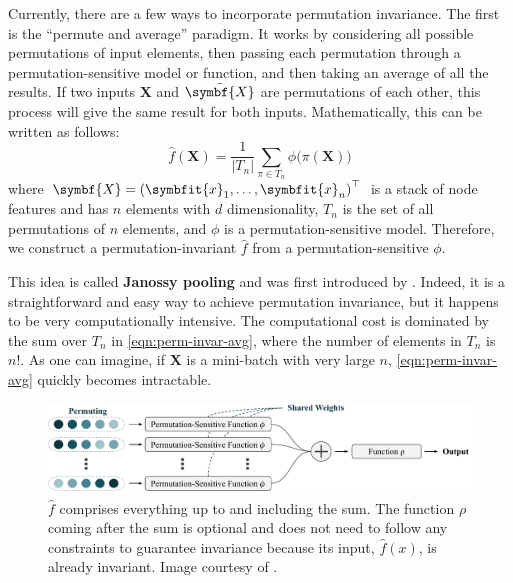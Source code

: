 Currently, there are a few ways to incorporate permutation invariance. The first is the ``permute and average'' paradigm. It works by considering all possible permutations of input elements, then passing each permutation through a permutation-sensitive model or function, and then taking an average of all the results. If two inputs $\symbf{X}$ and $\Tilde{\symbf{X}}$ are permutations of each other, this process will give the same result for both inputs. Mathematically, this can be written as follows:
\begin{equation}
    \label{eqn:perm-invar-avg}
    \widehat{f}(\symbf{X}) = \frac{1}{|{T}_n|} \sum_{\pi \in {T}_n} \phi \bigl( \pi \left( \symbf{X} \right) \bigr)
\end{equation}
where $\symbf{X}=\left(\symbfit{x}_1, \ldots, \symbfit{x}_n\right)^\top$ is a stack of node features and has $n$ elements with $d$ dimensionality, $T_n$ is the set of all permutations of $n$ elements, and $\phi$ is a permutation-sensitive model. Therefore, we construct a permutation-invariant $\widehat{f}$ from a permutation-sensitive $\phi$.

This idea is called \textbf{Janossy pooling} and was first introduced by \textcite{Murphy2018}. Indeed, it is a straightforward and easy way to achieve permutation invariance, but it happens to be very computationally intensive. The computational cost is dominated by the sum over $T_n$ in \cref{eqn:perm-invar-avg}, where the number of elements in $T_n$ is $n!$. As one can imagine, if $\symbf{X}$ is a mini-batch with very large $n$, \cref{eqn:perm-invar-avg} quickly becomes intractable.

\begin{figure}[bh]
    \centering
    \includegraphics[width=\textwidth]{chapters/assets/graph-figs/permuting.pdf}
    \caption{$\widehat{f}$ comprises everything up to and including the sum. The function $\rho$ coming after the sum is optional and does not need to follow any constraints to guarantee invariance because its input, $\widehat{f}(x)$, is already invariant. Image courtesy of \textcite{wagstaff2022universal}.}
    \label{fig:basic-perm-invar}
\end{figure}

